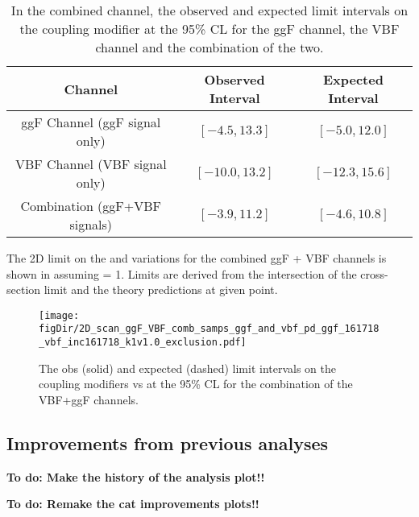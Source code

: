 \begin{table}[h]
	\centering
	\begin{tabular}{c c c}
		\toprule
		{Channel} & {Observed Interval} & {Expected Interval} \\
		\midrule
		{ggF Channel (ggF signal only)} & {$[-4.5, 13.3]$} & {$[-5.0, 12.0]$}  \\
		{VBF Channel (VBF signal only)}  & {$[-10.0, 13.2]$} & {$[-12.3, 15.6]$} \\
		{Combination (ggF+VBF signals)} & {$[-3.9, 11.2]$} & {$[-4.6, 10.8]$}  \\
		\bottomrule
	\end{tabular}
	\caption{In the combined channel, the observed and expected limit intervals on the coupling modifier \kl at the 95\% CL for the ggF channel, the VBF channel and the combination of the two.}
\label{table:kl-chan-comp-tab}
\end{table}



The 2D limit on the \kvv and \kl variations for the combined ggF + VBF channels is shown in \Fig{\ref{fig:2d-lim}} assuming \kv = 1.
Limits are derived from the intersection of the cross-section limit and the theory predictions at given point.

\begin{figure}[ht]
	\centering
	\texttt{[image: \\figDir/2D\_scan\_ggF\_VBF\_comb\_samps\_ggf\_and\_vbf\_pd\_ggf\_161718\_vbf\_inc161718\_k1v1.0\_exclusion.pdf]}
	\caption{The obs (solid) and expected (dashed) limit intervals on the coupling modifiers \kl vs \kvv  at the 95\% CL for the combination of the VBF+ggF channels.}
	\label{fig:2d-lim}
\end{figure}

\subsection{Improvements from previous analyses}

\textbf{To do: Make the history of the analysis plot!!}

\textbf{To do: Remake the cat improvements plots!!}


